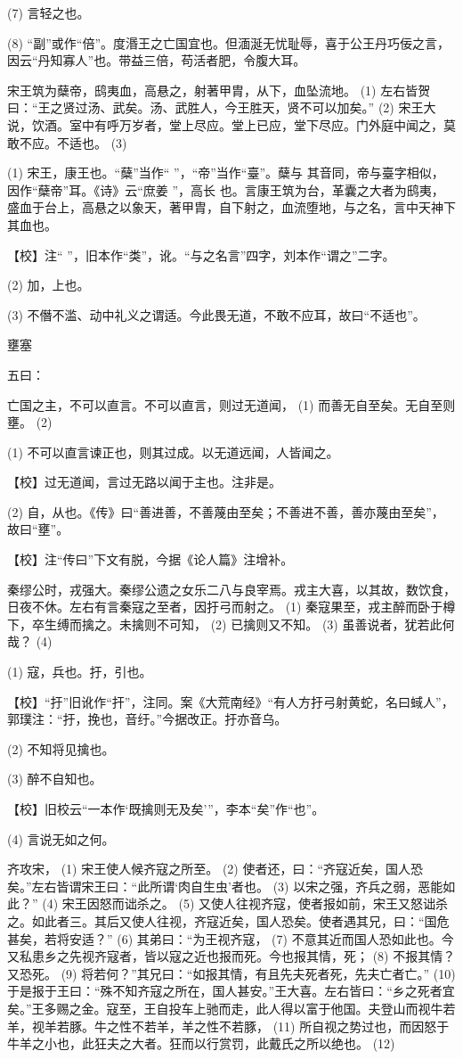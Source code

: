 \documentclass[12pt,UTF8]{ctexbook}
\begin{document}
(7) 言轻之也。

(8) “副”或作“倍”。度湣王之亡国宜也。但湎涎无忧耻辱，喜于公王丹巧佞之言，因云“丹知寡人”也。带益三倍，苟活者肥，令腹大耳。

宋王筑为蘖帝，鸱夷血，高悬之，射著甲胄，从下，血坠流地。 (1) 左右皆贺曰：“王之贤过汤、武矣。汤、武胜人，今王胜天，贤不可以加矣。” (2) 宋王大说，饮酒。室中有呼万岁者，堂上尽应。堂上已应，堂下尽应。门外庭中闻之，莫敢不应。不适也。 (3)

(1) 宋王，康王也。“蘖”当作“ ”，“帝”当作“臺”。蘖与 其音同，帝与臺字相似，因作“蘖帝”耳。《诗》云“庶姜 ”，高长 也。言康王筑为台，革囊之大者为鸱夷，盛血于台上，高悬之以象天，著甲胄，自下射之，血流堕地，与之名，言中天神下其血也。

【校】注“ ”，旧本作“类”，讹。“与之名言”四字，刘本作“谓之”二字。

(2) 加，上也。

(3) 不僭不滥、动中礼义之谓适。今此畏无道，不敢不应耳，故曰“不适也”。





壅塞


五曰：

亡国之主，不可以直言。不可以直言，则过无道闻， (1) 而善无自至矣。无自至则壅。 (2)

(1) 不可以直言谏正也，则其过成。以无道远闻，人皆闻之。

【校】过无道闻，言过无路以闻于主也。注非是。

(2) 自，从也。《传》曰“善进善，不善蔑由至矣；不善进不善，善亦蔑由至矣”，故曰“壅”。

【校】注“传曰”下文有脱，今据《论人篇》注增补。

秦缪公时，戎强大。秦缪公遗之女乐二八与良宰焉。戎主大喜，以其故，数饮食，日夜不休。左右有言秦寇之至者，因扜弓而射之。 (1) 秦寇果至，戎主醉而卧于樽下，卒生缚而擒之。未擒则不可知， (2) 已擒则又不知。 (3) 虽善说者，犹若此何哉？ (4)

(1) 寇，兵也。扜，引也。

【校】“扜”旧讹作“扞”，注同。案《大荒南经》“有人方扜弓射黄蛇，名曰蜮人”，郭璞注：“扜，挽也，音纡。”今据改正。扜亦音乌。

(2) 不知将见擒也。

(3) 醉不自知也。

【校】旧校云“一本作‘既擒则无及矣’”，李本“矣”作“也”。

(4) 言说无如之何。

齐攻宋， (1) 宋王使人候齐寇之所至。 (2) 使者还，曰：“齐寇近矣，国人恐矣。”左右皆谓宋王曰：“此所谓‘肉自生虫’者也。 (3) 以宋之强，齐兵之弱，恶能如此？” (4) 宋王因怒而诎杀之。 (5) 又使人往视齐寇，使者报如前，宋王又怒诎杀之。如此者三。其后又使人往视，齐寇近矣，国人恐矣。使者遇其兄，曰：“国危甚矣，若将安适？” (6) 其弟曰：“为王视齐寇， (7) 不意其近而国人恐如此也。今又私患乡之先视齐寇者，皆以寇之近也报而死。今也报其情，死； (8) 不报其情？又恐死。 (9) 将若何？”其兄曰：“如报其情，有且先夫死者死，先夫亡者亡。” (10) 于是报于王曰：“殊不知齐寇之所在，国人甚安。”王大喜。左右皆曰：“乡之死者宜矣。”王多赐之金。寇至，王自投车上驰而走，此人得以富于他国。夫登山而视牛若羊，视羊若豚。牛之性不若羊，羊之性不若豚， (11) 所自视之势过也，而因怒于牛羊之小也，此狂夫之大者。狂而以行赏罚，此戴氏之所以绝也。 (12)
\end{document}
